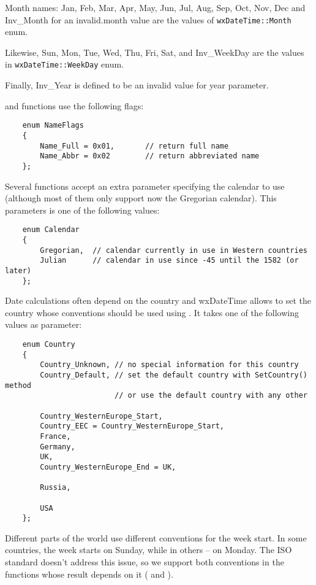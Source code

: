 Month names: Jan, Feb, Mar, Apr, May, Jun, Jul, Aug, Sep, Oct, Nov, Dec and
Inv\_Month for an invalid.month value are the values of {\tt wxDateTime::Month}
enum.

Likewise, Sun, Mon, Tue, Wed, Thu, Fri, Sat, and Inv\_WeekDay are the values in
{\tt wxDateTime::WeekDay} enum.

Finally, Inv\_Year is defined to be an invalid value for year parameter.

 and
 functions use the following
flags:

\begin{verbatim}
    enum NameFlags
    {
        Name_Full = 0x01,       // return full name
        Name_Abbr = 0x02        // return abbreviated name
    };
\end{verbatim}

Several functions accept an extra parameter specifying the calendar to use
(although most of them only support now the Gregorian calendar). This
parameters is one of the following values:

\begin{verbatim}
    enum Calendar
    {
        Gregorian,  // calendar currently in use in Western countries
        Julian      // calendar in use since -45 until the 1582 (or later)
    };
\end{verbatim}

Date calculations often depend on the country and wxDateTime allows to set the
country whose conventions should be used using
. It takes one of the following
values as parameter:

\begin{verbatim}
    enum Country
    {
        Country_Unknown, // no special information for this country
        Country_Default, // set the default country with SetCountry() method
                         // or use the default country with any other

        Country_WesternEurope_Start,
        Country_EEC = Country_WesternEurope_Start,
        France,
        Germany,
        UK,
        Country_WesternEurope_End = UK,

        Russia,

        USA
    };
\end{verbatim}

Different parts of the world use different conventions for the week start.
In some countries, the week starts on Sunday, while in others -- on Monday.
The ISO standard doesn't address this issue, so we support both conventions in
the functions whose result depends on it ( and
).

